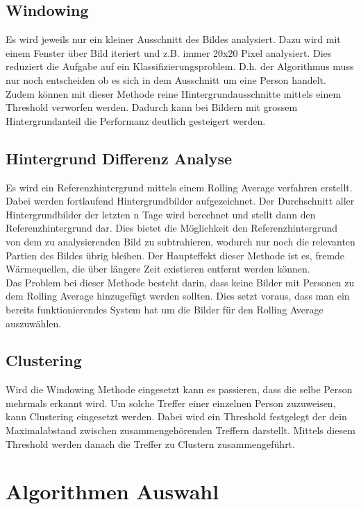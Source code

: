 \subsection{Windowing}

Es wird jeweils nur ein kleiner Ausschnitt des Bildes analysiert. Dazu wird mit einem Fenster über Bild iteriert und z.B. immer 20x20 Pixel analysiert. Dies reduziert die Aufgabe auf ein Klassifizierungsproblem. D.h. der Algorithmus muss nur noch entscheiden ob es sich in dem Ausschnitt um eine Person handelt. Zudem können mit dieser Methode reine Hintergrundausschnitte mittels einem Threshold verworfen werden. Dadurch kann bei Bildern mit grossem Hintergrundanteil die Performanz deutlich gesteigert werden.


\subsection{Hintergrund Differenz Analyse}

Es wird ein Referenzhintergrund mittels einem Rolling Average verfahren erstellt. Dabei werden fortlaufend Hintergrundbilder aufgezeichnet. Der Durchschnitt aller Hintergrundbilder der letzten n Tage wird berechnet und stellt dann den Referenzhintergrund dar. Dies bietet die Möglichkeit den Referenzhintergrund von dem zu analysierenden Bild zu subtrahieren, wodurch nur noch die relevanten Partien des Bildes übrig bleiben. Der Haupteffekt dieser Methode ist es, fremde Wärmequellen, die über längere Zeit existieren entfernt werden können.\\
Das Problem bei dieser Methode besteht darin, dass keine Bilder mit Personen zu dem Rolling Average hinzugefügt werden sollten. Dies setzt voraus, dass man ein bereits funktionierendes System hat um die Bilder für den Rolling Average auszuwählen.


\subsection{Clustering}

Wird die Windowing Methode eingesetzt kann es passieren, dass die selbe Person mehrmals erkannt wird. Um solche Treffer einer einzelnen Person zuzuweisen, kann Clustering eingesetzt werden. Dabei wird ein Threshold festgelegt der dein Maximalabstand zwischen zusammengehörenden Treffern darstellt. Mittels diesem Threshold werden danach die Treffer zu Clustern zusammengeführt.


\section{Algorithmen Auswahl}

